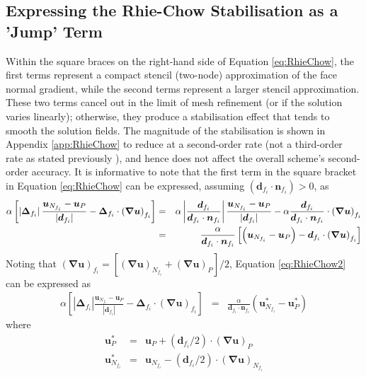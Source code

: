 \documentclass[sn-mathphys,Numbered]{sn-jnl}%
\newcommand{\bb}{\boldsymbol}
\begin{document}
\begin{appendices}
\section{Expressing the Rhie-Chow Stabilisation as a 'Jump' Term}
\label{app:RhieChowJump}
Within the square braces on the right-hand side of Equation \ref{eq:RhieChow}, the first terms represent a compact stencil (two-node) approximation of the face normal gradient, while the second terms represent a larger stencil approximation.
These two terms cancel out in the limit of mesh refinement (or if the solution varies linearly); otherwise, they produce a stabilisation effect that tends to smooth the solution fields.
The magnitude of the stabilisation is shown in Appendix \ref{app:RhieChow} to reduce at a second-order rate (not a third-order rate as stated previously \citep{Demirdzic1995}), and hence does not affect the overall scheme's second-order accuracy.
It is informative to note that the first term in the square bracket in Equation \ref{eq:RhieChow} can be expressed, assuming $(\bb{d}_{f_i} \cdot \bb{n}_{f_i}) > 0$, as
\begin{eqnarray} \label{eq:RhieChow2}
	\alpha \left[ \left|\bb{\Delta}_{f_i} \right| \frac{ \bb{u}_{N_{f_i}} - \bb{u}_P}{\left|\bb{d}_{f_i}\right|}	-  \bb{\Delta}_{f_i} \cdot \left(\bb{\nabla} \bb{u} \right)_{f_i} \right]
	&=&
	\alpha \left| \frac{\bb{d}_{f_i}}{\bb{d}_{f_i} \cdot \bb{n}_{f_i}} \right| \frac{ \bb{u}_{N_{f_i}} - \bb{u}_P}{\left|\bb{d}_{f_i}\right|}
	-  \alpha \frac{\bb{d}_{f_i}}{\bb{d}_{f_i} \cdot \bb{n}_{f_i}} \cdot \left(\bb{\nabla} \bb{u} \right)_{f_i} \notag \\
	&=&
	\frac{\alpha}{\bb{d}_{f_i} \cdot \bb{n}_{f_i}} \left[ \left( \bb{u}_{N_{f_i}} - \bb{u}_P \right) -  \bb{d}_{f_i} \cdot \left(\bb{\nabla} \bb{u} \right)_{f_i} \right]
\end{eqnarray}
Noting that $\left(\bb{\nabla} \bb{u} \right)_{f_i} = \left[ \left(\bb{\nabla} \bb{u} \right)_{N_{f_i}} + \left(\bb{\nabla} \bb{u} \right)_P \right]/2$, Equation \ref{eq:RhieChow2} can be expressed as
\begin{eqnarray}
	\alpha \left[ \left|\bb{\Delta}_{f_i} \right| \frac{ \bb{u}_{N_{f_i}} - \bb{u}_P}{\left|\bb{d}_{f_i}\right|}	-  \bb{\Delta}_{f_i} \cdot \left(\bb{\nabla} \bb{u} \right)_{f_i} \right]
	&=&
	\frac{\alpha}{\bb{d}_{f_i} \cdot \bb{n}_{f_i}} \left( \bb{u}_{N_{f_i}}^* - \bb{u}_P^* \right)
\end{eqnarray}
where
\begin{eqnarray}
	\bb{u}_P^* &=& \bb{u}_P + (\bb{d}_{f_i}/2) \cdot \left(\bb{\nabla} \bb{u} \right)_P  \\
	\bb{u}_{N_{f_i}}^* &=& \bb{u}_{N_{f_i}} - (\bb{d}_{f_i}/2) \cdot \left(\bb{\nabla} \bb{u} \right)_{N_{f_i}}
\end{eqnarray}


\end{appendices}
\end{document}

